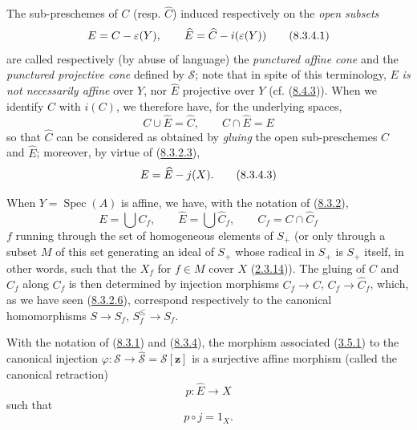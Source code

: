 \begin{env}[8.3.4]
\label{II.8.3.4}
The sub-preschemes of $C$ (resp. $\widehat{C}$) induced respectively on
the \emph{open subsets}
\begin{equation}
\label{II.8.3.4.1}
  E=C-\varepsilon(Y),\qquad
  \widehat{E}=\widehat{C}- i(\varepsilon(Y))
\tag{8.3.4.1}
\end{equation}
are called respectively (by abuse of language) the \emph{punctured affine
cone} and the \emph{punctured projective cone} defined by $\mathcal{S}$; note
that in spite of this terminology, $E$ \emph{is not necessarily
affine} over $Y$, nor $\widehat{E}$ projective over $Y$
(cf. (\hyperref[II.8.4.3]{8.4.3})). When we identify $C$ with $i(C)$, we
therefore have, for the underlying spaces,
\begin{equation}
\label{II.8.3.4.2}
  C\cup\widehat{E}=\widehat{C},\qquad C\cap\widehat{E}=E
\tag{8.3.4.2}
\end{equation}
so that $\widehat{C}$ can be considered as obtained by
\emph{gluing} the open sub-preschemes $C$ and $\widehat{E}$; moreover,
by virtue of (\hyperref[II.8.3.2.3]{8.3.2.3}),
\begin{equation}
\label{II.8.3.4.3}
  E=\widehat{E}- j(X).
\tag{8.3.4.3}
\end{equation}

When $Y=\operatorname{Spec}(A)$ is affine, we have, with the notation of
(\hyperref[II.8.3.2]{8.3.2}),
\begin{equation}
\label{II.8.3.4.4}
  E=\bigcup C_f,\qquad
  \widehat{E}=\bigcup\widehat{C}_f,\qquad
  C_f=C\cap\widehat{C}_f
\tag{8.3.4.4}
\end{equation}
$f$ running through the set of homogeneous elements of $S_+$ (or only through a
subset $M$ of this set generating an ideal of $S_+$ whose radical in
$S_+$ is $S_+$ itself, in other words, such that the $X_f$ for $f\in M$
cover $X$ (\hyperref[II.2.3.14]{2.3.14})). The gluing of $C$ and
$\widehat{C}_f$ along $C_f$ is then determined by injection morphisms
$C_f\to C$, $C_f\to\widehat{C}_f$, which, as we have seen
(\hyperref[II.8.3.2.6]{8.3.2.6}), correspond respectively to the
canonical homomorphisms $S\to S_f$, $S_f^{\leq}\to S_f$.
\end{env}

\begin{proposition}[8.3.5]
\label{II.8.3.5}
With the notation of \textup{(\hyperref[II.8.3.1]{8.3.1})} and
\textup{(\hyperref[II.8.3.4]{8.3.4})}, the morphism associated
\textup{(\hyperref[II.3.5.1]{3.5.1})} to the canonical injection
$\varphi:\mathcal{S}\to\widehat{\mathcal{S}}=\mathcal{S}[\mathbf{z}]$ is a surjective
affine morphism \textup{(called the} canonical retraction)
\begin{equation}
\label{II.8.3.5.1}
  p:\widehat{E}\to X
\tag{8.3.5.1}
\end{equation}
such that
\begin{equation}
\label{II.8.3.5.2}
  p\circ j=1_X.
\tag{8.3.5.2}
\end{equation}
\end{proposition}

